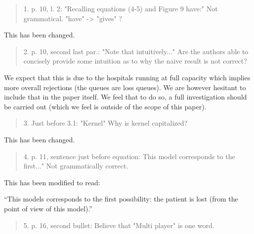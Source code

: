 \documentclass{article}
\begin{document}
\begin{quote}
    \begin{textit}{
1. p. 10, l. 2: "Recalling equations (4-5) and Figure 9 have:"
Not grammatical. "have" -> "gives" ?
    }\end{textit}
\end{quote}

This has been changed.

\begin{quote}
    \begin{textit}{
        2. p. 10, second last par.: "Note that intuitively..."
        Are the authors able to concisely provide some intuition as to why
        the naive result is not correct?
    }\end{textit}
\end{quote}

We expect that this is due to the hospitals running at full capacity which
implies more overall rejections (the queues are loss queues). We are however
hesitant to include that in the paper itself. We feel that to do so, a full
investigation should be carried out (which we feel is outside of the scope of
this paper).

\begin{quote}
    \begin{textit}{
        3. Just before 3.1: "Kernel"
        Why is kernel capitalized?
    }\end{textit}
\end{quote}

This has been changed.

\begin{quote}
    \begin{textit}{
        4. p. 11, sentence just before equation: This model corresponds to
        the first..."
        Not grammatically correct.
    }\end{textit}
\end{quote}

This has been modified to read:

``This models corresponds to the first
possibility: the patient is lost (from the point of view of this model).''


\begin{quote}
    \begin{textit}{
        5. p. 16, second bullet:
        Believe that "Multi player" is one word.
    }\end{textit}
\end{quote}
\end{document}
